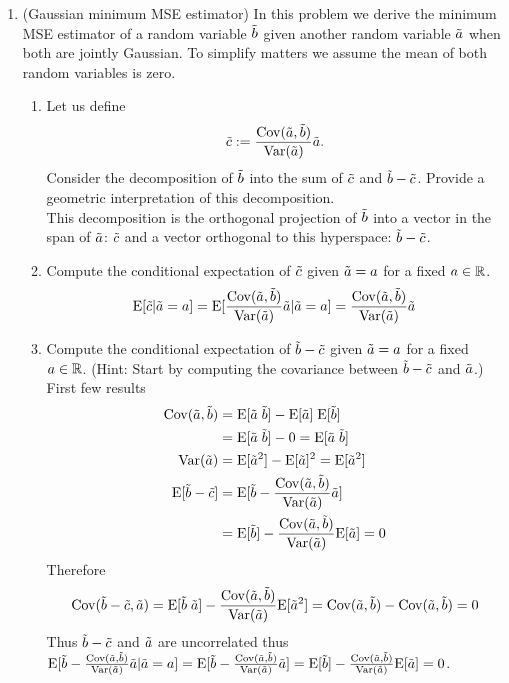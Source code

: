 \documentclass[12pt,twoside]{article}
\begin{document}
\begin{enumerate}
\begin{enumerate}
\begin{proof}
\end{proof}

\end{enumerate}

\newpage

\item (Gaussian minimum MSE estimator) In this problem we derive the minimum MSE estimator of a random variable $\tilde{ b }$ given another random variable $\tilde{ a }$ when both are jointly Gaussian. To simplify matters we assume the mean of both random variables is zero. 
  \begin{enumerate}
  \item Let us define
  \begin{align}
  \rnd{c} := \frac{\cov(\ra,\rb)}{\var(\ra)}\ra.
  \end{align}
  Consider the decomposition of $\tilde{ b }$ into the sum of $\tilde{ c } $ and $\tilde{  b } - \tilde{ c }$. Provide a geometric interpretation of this decomposition. \\
  This decomposition is the orthogonal projection of $\tilde{ b }$ into a vector in the span of $\tilde{ a }$: $\tilde{ c }$ and a vector orthogonal to this hyperspace:  $\tilde{  b } - \tilde{ c }$.
  
  \item Compute the conditional expectation of $\tilde{ c } $ given $\tilde{  a }=a$ for a fixed $a \in \mathbb{R}$.
  $$\E[\rnd{c} | \rnd{a}= a] = \E[\frac{\cov(\ra,\rb)}{\var(\ra)}\ra | \ra= a] = \frac{\cov(\ra,\rb)}{\var(\ra)}\ra$$
  
  \item Compute the conditional expectation of $\tilde{  b } - \tilde{ c }$ given $\tilde{  a }=a$ for a fixed $a \in \mathbb{R}$. (Hint: Start by computing the covariance between $\tilde{  b } - \tilde{ c }$ and $\tilde{  a }$.)
  First few results
  \begin{align*}
  	\cov(\ra, \rb)	&=	 \E[\ra \; \rb]	- \E[\ra] \; \E[\rb]	\\
				&=	 \E[\ra \; \rb] - 0 = \E[\ra \; \rb] 		\\
	\var(\ra)		&=	 \E[\ra^2] - \E[\ra]^2 =  \E[\ra^2]		\\
	\E[\rb  - \rnd{c}]	&= 	 \E[ \rb  - \frac{\cov(\ra,\rb)}{\var(\ra)}\ra] \\
				&=	 \E[ \rb] - \frac{\cov(\ra,\rb)}{\var(\ra)} \E[\ra] = 0 
  \end{align*}
  Therefore $$\cov(\rb  - \rnd{c}, \ra)   = \E[ \rb  \; \ra] -  \frac{\cov(\ra,\rb)}{\var(\ra)} \E[\ra^2]  = \cov(\ra, \rb) - \cov(\ra, \rb) = 0$$
  Thus  $\tilde{  b }  - \tilde{ c }$ and $\tilde{  a }$ are uncorrelated thus $\E[ \rb - \frac{\cov(\ra,\rb)}{\var(\ra)} \ra | \ra= a ] = \E[ \rb - \frac{\cov(\ra,\rb)}{\var(\ra)} \ra] = \E[ \rb] -  \frac{\cov(\ra,\rb)}{\var(\ra)}  \E[\ra] = 0$.
  

\end{enumerate}
\end{enumerate}
\end{document}
